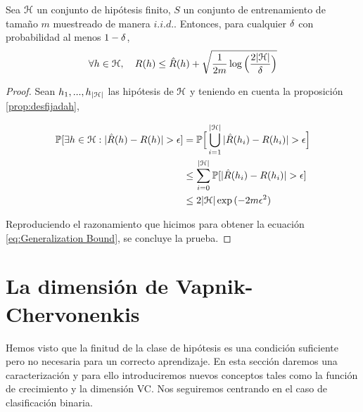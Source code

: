     \begin{proposicion}

    Sea $\mathcal{H}$ un conjunto de hipótesis finito, $S$ un conjunto de entrenamiento de tamaño $m$ muestreado de manera $i.i.d.$. Entonces, para cualquier $\delta$ con probabilidad al menos $1-\delta$,
    \begin{equation}
    \forall h \in \mathcal{H}, \quad R(h) \leq \hat{R}(h) + \sqrt{\frac{1}{2m} \log \Big( \frac{2|\mathcal{H}|}{\delta} \Big)}
    \end{equation}
    \end{proposicion}


    \begin{proof}
    Sean $h_1,...,h_{|\mathcal{H}|}$ las hipótesis de $\mathcal{H}$ y teniendo en cuenta la proposición \ref{prop:desfijadah},
    
    \begin{equation}
        \begin{aligned}
            \mathbb{P}[\exists h \in \mathcal{H} : |\hat{R}(h) - R(h)| > \epsilon] & = \mathbb{P} \Big[\bigcup_{i = {1}}^{|\mathcal{H}|} |\hat{R}(h_i) - R(h_i) | > \epsilon\Big] \\
            & \leq \sum_{i = 0}^{|\mathcal{H}|} \mathbb{P}[|\hat{R}(h_i) - R(h_i)| > \epsilon] \\
            & \leq 2 |\mathcal{H}| \exp{(-2m\epsilon^2)}
        \end{aligned}
    \end{equation}
    
    Reproduciendo el razonamiento que hicimos para obtener la ecuación \eqref{eq:Generalization Bound}, se concluye la prueba.
    \end{proof}

    
\section{La dimensión de Vapnik-Chervonenkis}

    Hemos visto que la finitud de la clase de hipótesis es una condición suficiente pero no necesaria para un correcto aprendizaje. En esta sección daremos una caracterización y para ello introduciremos nuevos conceptos tales como la función de crecimiento y la dimensión VC. Nos seguiremos centrando en el caso de clasificación binaria. \\
    
